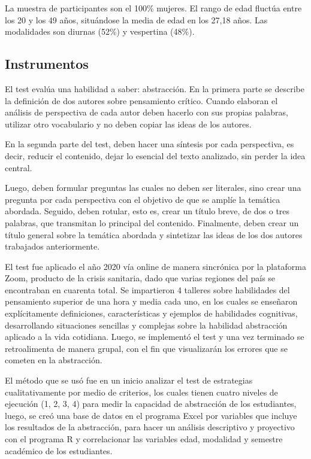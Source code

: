 \documentclass[spanish]{textolivre}
\begin{document}
La muestra de participantes son el 100\% mujeres. El rango de edad fluctúa entre los 20 y los 49 años, situándose la media de edad en los 27,18 años. Las modalidades son diurnas (52\%) y vespertina (48\%).

\subsection{Instrumentos}\label{instru}
El test evalúa una habilidad a saber: abstracción. En la primera parte se describe la definición de dos autores sobre pensamiento crítico. Cuando elaboran el análisis de perspectiva de cada autor deben hacerlo con sus propias palabras, utilizar otro vocabulario y no  deben copiar las ideas de los autores.

En la segunda parte del test, deben hacer una síntesis por cada perspectiva, es decir, reducir el contenido, dejar lo esencial del texto analizado, sin perder la idea central.

Luego, deben formular preguntas las cuales no deben ser literales, sino crear una pregunta por cada perspectiva con el objetivo de que se amplíe la temática abordada. Seguido, deben rotular, esto es, crear un título breve, de dos o tres palabras, que transmitan lo principal del contenido. Finalmente, deben crear un título general sobre la temática abordada y sintetizar las ideas de los dos autores trabajados anteriormente.

El test fue aplicado el año 2020 vía online de manera sincrónica por la plataforma Zoom, producto de la crisis sanitaria, dado que varias regiones del país se encontraban en cuarenta total.  Se impartieron 4 talleres sobre habilidades del pensamiento superior de una hora y media cada uno, en los cuales se enseñaron explícitamente definiciones, características y ejemplos de habilidades cognitivas, desarrollando situaciones sencillas y complejas sobre la habilidad abstracción aplicado a la vida cotidiana.  Luego, se implementó el test y una vez terminado se retroalimenta de manera grupal, con el fin que visualizarán los errores que se cometen en la abstracción.

El método que se usó fue en un inicio analizar el test de estrategias cualitativamente por medio de criterios, los cuales tienen cuatro niveles de ejecución (1, 2, 3, 4) para medir la capacidad de abstracción de los estudiantes, luego, se creó una base de datos en el programa Excel por variables que incluye los resultados  de la abstracción, para hacer un análisis descriptivo y proyectivo con el programa R y correlacionar las variables edad, modalidad y  semestre académico de los estudiantes.
\end{document}
